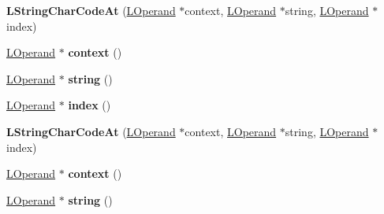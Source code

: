 \begin{DoxyCompactItemize}
\item 
{\bfseries L\+String\+Char\+Code\+At} (\hyperlink{classv8_1_1internal_1_1_l_operand}{L\+Operand} $\ast$context, \hyperlink{classv8_1_1internal_1_1_l_operand}{L\+Operand} $\ast$string, \hyperlink{classv8_1_1internal_1_1_l_operand}{L\+Operand} $\ast$index)\hypertarget{classv8_1_1internal_1_1_l_string_char_code_at_a2ea27a024b27a329ff76364ab55c7cd1}{}\label{classv8_1_1internal_1_1_l_string_char_code_at_a2ea27a024b27a329ff76364ab55c7cd1}

\item 
\hyperlink{classv8_1_1internal_1_1_l_operand}{L\+Operand} $\ast$ {\bfseries context} ()\hypertarget{classv8_1_1internal_1_1_l_string_char_code_at_a9482271a8172ce48522512f232ac24aa}{}\label{classv8_1_1internal_1_1_l_string_char_code_at_a9482271a8172ce48522512f232ac24aa}

\item 
\hyperlink{classv8_1_1internal_1_1_l_operand}{L\+Operand} $\ast$ {\bfseries string} ()\hypertarget{classv8_1_1internal_1_1_l_string_char_code_at_a935ea67cb0997a56225d8943bd28acfc}{}\label{classv8_1_1internal_1_1_l_string_char_code_at_a935ea67cb0997a56225d8943bd28acfc}

\item 
\hyperlink{classv8_1_1internal_1_1_l_operand}{L\+Operand} $\ast$ {\bfseries index} ()\hypertarget{classv8_1_1internal_1_1_l_string_char_code_at_a6d34721abedba9af5cdca55a18b388c2}{}\label{classv8_1_1internal_1_1_l_string_char_code_at_a6d34721abedba9af5cdca55a18b388c2}

\item 
{\bfseries L\+String\+Char\+Code\+At} (\hyperlink{classv8_1_1internal_1_1_l_operand}{L\+Operand} $\ast$context, \hyperlink{classv8_1_1internal_1_1_l_operand}{L\+Operand} $\ast$string, \hyperlink{classv8_1_1internal_1_1_l_operand}{L\+Operand} $\ast$index)\hypertarget{classv8_1_1internal_1_1_l_string_char_code_at_a2ea27a024b27a329ff76364ab55c7cd1}{}\label{classv8_1_1internal_1_1_l_string_char_code_at_a2ea27a024b27a329ff76364ab55c7cd1}

\item 
\hyperlink{classv8_1_1internal_1_1_l_operand}{L\+Operand} $\ast$ {\bfseries context} ()\hypertarget{classv8_1_1internal_1_1_l_string_char_code_at_a9482271a8172ce48522512f232ac24aa}{}\label{classv8_1_1internal_1_1_l_string_char_code_at_a9482271a8172ce48522512f232ac24aa}

\item 
\hyperlink{classv8_1_1internal_1_1_l_operand}{L\+Operand} $\ast$ {\bfseries string} ()\hypertarget{classv8_1_1internal_1_1_l_string_char_code_at_a935ea67cb0997a56225d8943bd28acfc}{}\label{classv8_1_1internal_1_1_l_string_char_code_at_a935ea67cb0997a56225d8943bd28acfc}


\end{DoxyCompactItemize}
